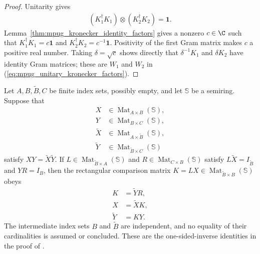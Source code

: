 \begin{proof}\leanok
    Unitarity gives
    \begin{align}
        (K_1^\dagger K_1)\otimes(K_2^\dagger K_2)=\mathbf 1.
    \end{align}
    Lemma~\ref{thm:mpug_kronecker_identity_factors} gives a nonzero
    $c\in\C$ such that
    $K_1^\dagger K_1=c\mathbf 1$ and
    $K_2^\dagger K_2=c^{-1}\mathbf 1$. Positivity of the first Gram matrix
    makes $c$ a positive real number. Taking $\delta=\sqrt c$ shows directly
    that $\delta^{-1}K_1$ and $\delta K_2$ have identity Gram matrices; these
    are $W_1$ and $W_2$ in
    (\ref{eq:mpug_unitary_kronecker_factors}).
\end{proof}

\begin{lemma}
    \label{thm:mpug_factorization_comparison}
    \leanok
    Let $A,B,\widetilde B,C$ be finite index sets, possibly empty, and let
    $\mathbb S$ be a semiring. Suppose that
    \begin{align}
        X            & \in\operatorname{Mat}_{A\times B}(\mathbb S),           \\
        Y            & \in\operatorname{Mat}_{B\times C}(\mathbb S),           \\
        \widetilde X & \in\operatorname{Mat}_{A\times\widetilde B}(\mathbb S), \\
        \widetilde Y & \in\operatorname{Mat}_{\widetilde B\times C}(\mathbb S)
    \end{align}
    satisfy $XY=\widetilde X\widetilde Y$. If
    $L\in\operatorname{Mat}_{\widetilde B\times A}(\mathbb S)$ and
    $R\in\operatorname{Mat}_{C\times B}(\mathbb S)$ satisfy
    $L\widetilde X=I_{\widetilde B}$ and $YR=I_B$, then the rectangular
    comparison matrix $K=LX\in\operatorname{Mat}_{\widetilde B\times B}(\mathbb S)$
    obeys
    \begin{align}
        K            & =\widetilde YR, \\
        X            & =\widetilde XK, \\
        \widetilde Y & =KY.
    \end{align}
    The intermediate index sets $B$ and $\widetilde B$ are independent, and
    no equality of their cardinalities is assumed or concluded. These are the
    one-sided-inverse identities in the proof of
    \cite[lines~1052--1066]{FrancoRubio2025MPUGauging}.
\end{lemma}

